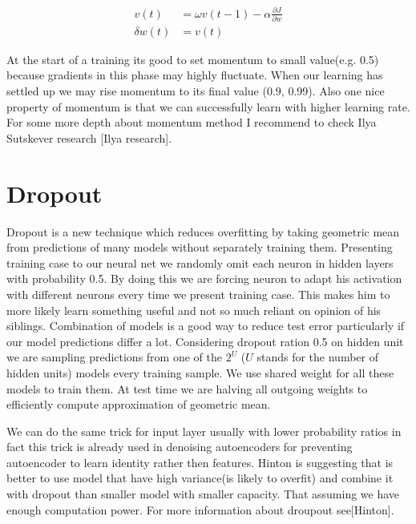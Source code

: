 \begin{equation}
\begin{aligned}
v(t) &= \omega v(t-1)-\alpha\frac{\partial J}{\partial w} \\
\delta w(t) &= v(t)
\end{aligned}
\end{equation}

At the start of a training its good to set momentum to small value(e.g. 0.5) because gradients in this phase may highly fluctuate. When our learning has settled up we may rise momentum to its final value (0.9, 0.99). Also one nice property of momentum is that we can successfully learn with higher learning rate. For some more depth about momentum method I recommend to check Ilya Sutskever research [Ilya research]. 

\section{Dropout}
Dropout is a new technique which reduces overfitting by taking geometric mean from predictions of many models without separately training them. Presenting training case to our neural net we randomly omit each neuron in hidden layers with probability 0.5. By doing this we are forcing neuron to adapt his activation with different neurons every time we present training case. This makes him to more likely learn something useful and not so much reliant on opinion of his siblings. Combination of models is a good way to reduce test error particularly if our model predictions differ a lot. Considering dropout ration 0.5 on hidden unit we are sampling predictions from one of the \(2^U\) (\(U\) stands for the number of hidden units) models every training sample. We use shared weight for all these models to train them. At test time we are halving all outgoing weights to efficiently compute approximation of geometric mean.

We can do the same trick for input layer usually with lower probability ratios in fact this trick is already used in denoising autoencoders for preventing autoencoder to learn identity rather then features. Hinton is suggesting that is better to use model that have high variance(is likely to overfit) and combine it with dropout than smaller model with smaller capacity. That assuming we have enough computation power. For more information about droupout see[Hinton].

